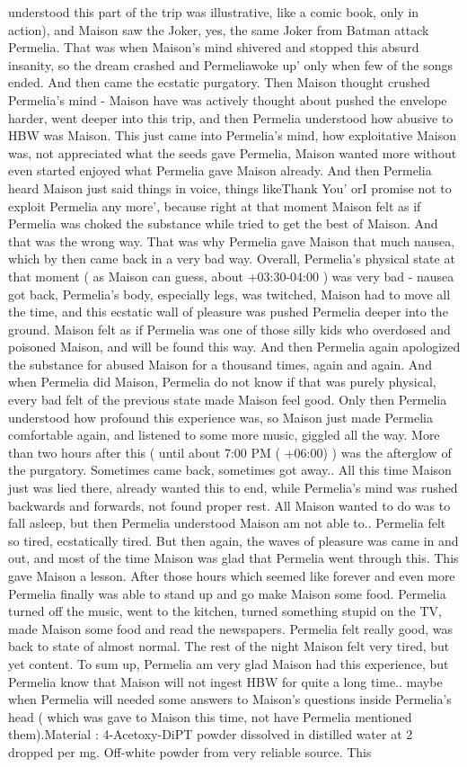 \documentclass[12pt]{book}
\begin{document}
understood this part of the trip was illustrative, like a comic book, only in action), and Maison saw the Joker, yes, the same Joker from Batman attack Permelia. That was when Maison's mind shivered and stopped this absurd insanity, so the dream crashed and Permeliawoke up' only when few of the songs ended. And then came the ecstatic purgatory. Then Maison thought crushed Permelia's mind - Maison have was actively thought about pushed the envelope harder, went deeper into this trip, and then Permelia understood how abusive to HBW was Maison. This just came into Permelia's mind, how exploitative Maison was, not appreciated what the seeds gave Permelia, Maison wanted more without even started enjoyed what Permelia gave Maison already. And then Permelia heard Maison just said things in voice, things likeThank You' orI promise not to exploit Permelia any more', because right at that moment Maison felt as if Permelia was choked the substance while tried to get the best of Maison. And that was the wrong way. That was why Permelia gave Maison that much nausea, which by then came back in a very bad way. Overall, Permelia's physical state at that moment ( as Maison can guess, about +03:30-04:00 ) was very bad - nausea got back, Permelia's body, especially legs, was twitched, Maison had to move all the time, and this ecstatic wall of pleasure was pushed Permelia deeper into the ground. Maison felt as if Permelia was one of those silly kids who overdosed and poisoned Maison, and will be found this way. And then Permelia again apologized the substance for abused Maison for a thousand times, again and again. And when Permelia did Maison, Permelia do not know if that was purely physical, every bad felt of the previous state made Maison feel good. Only then Permelia understood how profound this experience was, so Maison just made Permelia comfortable again, and listened to some more music, giggled all the way. More than two hours after this ( until about 7:00 PM ( +06:00) ) was the afterglow of the purgatory. Sometimes came back, sometimes got away.. All this time Maison just was lied there, already wanted this to end, while Permelia's mind was rushed backwards and forwards, not found proper rest. All Maison wanted to do was to fall asleep, but then Permelia understood Maison am not able to.. Permelia felt so tired, ecstatically tired. But then again, the waves of pleasure was came in and out, and most of the time Maison was glad that Permelia went through this. This gave Maison a lesson. After those hours which seemed like forever and even more Permelia finally was able to stand up and go make Maison some food. Permelia turned off the music, went to the kitchen, turned something stupid on the TV, made Maison some food and read the newspapers. Permelia felt really good, was back to state of almost normal. The rest of the night Maison felt very tired, but yet content. To sum up, Permelia am very glad Maison had this experience, but Permelia know that Maison will not ingest HBW for quite a long time.. maybe when Permelia will needed some answers to Maison's questions inside Permelia's head ( which was gave to Maison this time, not have Permelia mentioned them).Material : 4-Acetoxy-DiPT powder dissolved in distilled water at 2 dropped per mg. Off-white powder from very reliable source. This 
\end{document}
